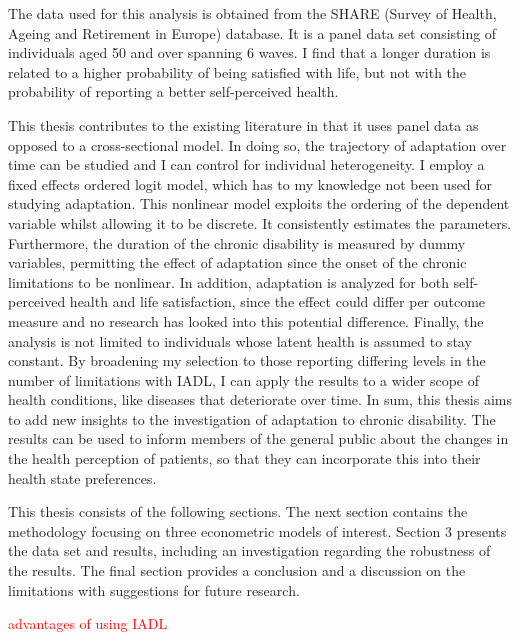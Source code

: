 \documentclass[12pt]{article}
\begin{document}
The data used for this analysis is obtained from the SHARE (Survey of Health, Ageing and Retirement in Europe) database. It is a panel data set consisting of individuals aged 50 and over spanning 6 waves. I find that a longer duration is related to a higher probability of being satisfied with life, but not with the probability of reporting a better self-perceived health. 

This thesis contributes to the existing literature in that it uses panel data as opposed to a cross-sectional model. In doing so, the trajectory of adaptation over time can be studied and I can control for individual heterogeneity. I employ a fixed effects ordered logit model, which has to my knowledge not been used for studying adaptation. This nonlinear model exploits the ordering of the dependent variable whilst allowing it to be discrete. It consistently estimates the parameters. Furthermore, the duration of the chronic disability is measured by dummy variables, permitting the effect of adaptation since the onset of the chronic limitations to be nonlinear. In addition, adaptation is analyzed for both self-perceived health and life satisfaction, since the effect could differ per outcome measure and no research has looked into this potential difference. Finally, the analysis is not limited to individuals whose latent health is assumed to stay constant. By broadening my selection to those reporting differing levels in the number of limitations with IADL, I can apply the results to a wider scope of health conditions, like diseases that deteriorate over time. In sum, this thesis aims to add new insights to the investigation of adaptation to chronic disability. The results can be used to inform members of the general public about the changes in the health perception of patients, so that they can incorporate this into their health state preferences. 

This thesis consists of the following sections. The next section contains the methodology focusing on three econometric models of interest. Section 3 presents the data set and results, including an investigation regarding the robustness of the results. The final section provides a conclusion and a discussion on the limitations with suggestions for future research.  

\textcolor{red}{advantages of using IADL}
\end{document}
